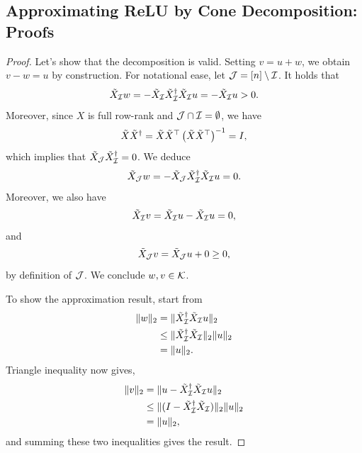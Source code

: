 \subsection{Approximating ReLU by Cone Decomposition: Proofs}\label{app:cone-decompositions}
\closedFormDecomp*
\begin{proof}
    Let's show that the decomposition is valid.
    Setting \( v = u + w \),
    we obtain \( v - w = u \) by construction.
    For notational ease, let \( \mathcal{J} = [n] \setminus \mathcal{I} \).
    It holds that
    \[
        \tilde X_{\mathcal{I}} w = - \tilde X_{\mathcal{I}} \tilde X_{\mathcal{I}}^\dagger \tilde X_{\mathcal{I}} u = - \tilde X_{\mathcal{I}} u > 0.
    \]
    Moreover, since \( X \) is full row-rank and \( \mathcal{J} \cap \mathcal{I} = \emptyset \), we have
    \[
        \tilde X \tilde X^\dagger = \tilde X \tilde X^\top \left(\tilde X \tilde X^\top\right)^{-1} = I,
    \]
    which implies that \( \tilde X_{\mathcal{J}} \tilde X_{\mathcal{I}}^\dagger = 0 \).
    We deduce
    \[
        \tilde X_{\mathcal{J}} w = - \tilde X_{\mathcal{J}} \tilde X_{\mathcal{I}}^\dagger \tilde X_{\mathcal{I}} u = 0.
    \]
    Moreover, we also have
    \[
        \tilde X_{\mathcal{I}} v = \tilde X_{\mathcal{I}} u - \tilde X_{\mathcal{I}} u = 0,
    \]
    and
    \[
        \tilde X_{\mathcal{J}} v = \tilde X_{\mathcal{J}} u + 0 \geq 0,
    \]
    by definition of \( \mathcal{J} \).
    We conclude \( w, v \in \mathcal{K} \).

    To show the approximation result, start from
    \begin{align*}
        \|w\|_2
         & = \|\tilde X_{\mathcal{I}}^\dagger \tilde X_{\mathcal{I}} u\|_2             \\
         & \leq \|\tilde X_{\mathcal{I}}^\dagger \tilde X_{\mathcal{I}}\|_2 \|u\|_2 \\
         & = \|u\|_2.
    \end{align*}
    Triangle inequality now gives,
    \begin{align*}
        \|v\|_2
         & = \|u - \tilde X_{\mathcal{I}}^\dagger \tilde X_{\mathcal{I}} u\|_2               \\
         & \leq \|(I - \tilde X_{\mathcal{I}}^\dagger \tilde X_{\mathcal{I}})\|_2 \|u\|_2 \\
         & = \|u\|_2,
    \end{align*}
    and summing these two inequalities gives the result.
\end{proof}

